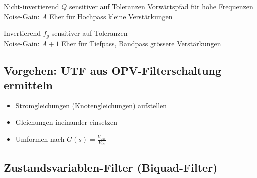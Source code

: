 \begin{minipage}[t]{0.48\columnwidth}
    \begin{center}
    \end{center}
    \begin{outline}
        \1 Nicht-invertierend
        \1 $Q$ sensitiver auf Toleranzen
        \1 Vorwärtspfad für hohe Frequenzen
        \1 Noise-Gain: $A$
        \1 Eher für 
            \2 Hochpass
            \2 kleine Verstärkungen
    \end{outline}
\end{minipage}
\hfill
\begin{minipage}[t]{0.48\columnwidth}
    \begin{center}
    \end{center}
    \begin{outline}
        \1 Invertierend
        \1 $f_g$ sensitiver auf Toleranzen 
        \\
        \1 Noise-Gain: $A+1$
        \1 Eher für 
            \2 Tiefpass, Bandpass
            \2 grössere Verstärkungen
    \end{outline}
\end{minipage}


\subsection{Vorgehen: UTF aus OPV-Filterschaltung ermitteln}
\begin{itemize}
    \item Stromgleichungen (Knotengleichungen) aufstellen
    \item Gleichungen ineinander einsetzen
    \item Umformen nach $G(s) = \frac{V_{out}}{V_{in}}$
\end{itemize}



\subsection{Zustandsvariablen-Filter (Biquad-Filter)}
\label{zustandsvariablenfilter}

